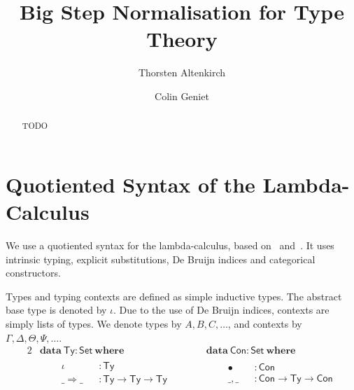 \documentclass[a4paper,english,cleveref,autoref,draft]{lipics-v2019}
\title{Big Step Normalisation for Type Theory}
\author{Thorsten Altenkirch}
{School for Computer Science, University of Nottingham, United Kingdom}
{txa@cs.nott.ac.uk}{}{}
\author{Colin Geniet}
{Departement of Informatics, ENS Paris-Saclay, France}
{colin.geniet@ens-paris-saclay.fr}{}{}
\newcommand{\agdaSymb}[1]{\mathsf{#1}}
\newcommand{\agdaKW}[1]{\mathbf{#1}}
\newcommand{\ind}{\hspace{1em}}
\newcommand{\data}{\agdaKW{data}}
\newcommand{\where}{\agdaKW{where}}
\newcommand{\Set}{\agdaSymb{Set}}
\newcommand{\Ty}{\agdaSymb{Ty}}
\newcommand{\Con}{\agdaSymb{Con}}
\newcommand{\Ra}{\Rightarrow}
\begin{document}
\maketitle

\begin{abstract}
TODO
\end{abstract}


\section{Quotiented Syntax of the Lambda-Calculus}
We use a quotiented syntax for the lambda-calculus, based on~\cite{kaposi2016type}
and~\cite{kaposi2016normalisation}. It uses intrinsic typing, explicit substitutions,
De Bruijn indices and categorical constructors.

Types and typing contexts are defined as simple inductive types.
The abstract base type is denoted by $\iota$.
Due to the use of De Bruijn indices, contexts are simply lists of types.
We denote types by $A,B,C,\dots$, and contexts by $\Gamma,\Delta,\Theta,\Psi,\dots$.
\begin{alignat*}{2}
  & \data\ \Ty : \Set\ \where && \data\ \Con : \Set\ \where \\
  & \ind
  \begin{alignedat}{2}
    & \iota && : \Ty \\
    & \_\Ra\_ && : \Ty \to \Ty \to \Ty \qquad
  \end{alignedat}
  && \ind
  \begin{alignedat}{2}
    & \bullet && : \Con \\
    & \_,\_ && : \Con \to \Ty \to \Con
  \end{alignedat}
\end{alignat*}
\end{document}

